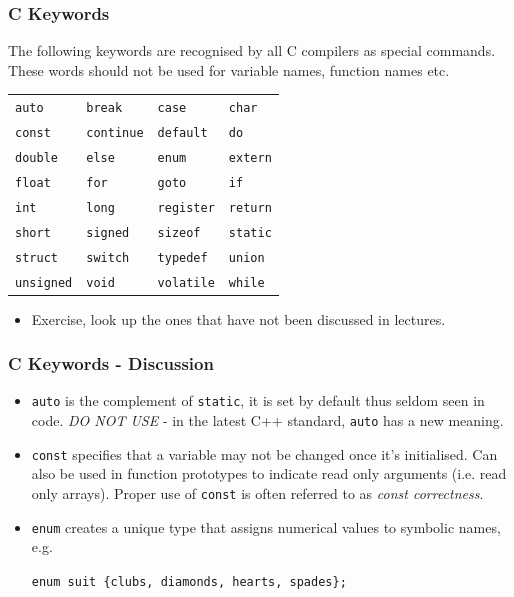 \documentclass[table]{beamer}
\newif\ifschigh\schighfalse
\newcommand{\kw}[1]{\ifschigh\textcolor{red}{#1}\else\textcolor{keyword}{#1}\fi}
\begin{document}
\begin{frame}
\frametitle{C Keywords}
The following keywords are recognised by all C compilers as special commands. These words should not be used for variable names, function names etc.
\begin{center}
\begin{tabular}{l l l l}
\tt\kw{auto}&\tt\kw{break}&\tt\kw{case}&\tt\kw{char}\\
\tt\kw{const}&\tt\kw{continue}&\tt\kw{default}&\tt\kw{do}\\
\tt\kw{double}&\tt\kw{else}&\tt\kw{enum}&\tt\kw{extern}\\
\tt\kw{float}&\tt\kw{for}&\tt\kw{goto}&\tt\kw{if}\\
\tt\kw{int}&\tt\kw{long}&\tt\kw{register}&\tt\kw{return}\\
\tt\kw{short}&\tt\kw{signed}&\tt\kw{sizeof}&\tt\kw{static}\\
\tt\kw{struct}&\tt\kw{switch}&\tt\kw{typedef}&\tt\kw{union}\\
\tt\kw{unsigned}&\tt\kw{void}&\tt\kw{volatile}&\tt\kw{while}
\end{tabular}
\end{center}
\begin{itemize}
\item Exercise, look up the ones that have not been discussed in lectures.
\end{itemize}
\end{frame}

\begin{frame}
\frametitle{C Keywords - Discussion}
\begin{itemize}
\item {\tt\kw{auto}} is the complement of {\tt\kw{static}}, it is set by default thus seldom seen in code. \emph{DO NOT USE} - in the latest C++ standard, {\tt\kw{auto}} has a new meaning.
\item {\tt\kw{const}} specifies that a variable may not be changed once it's initialised. Can also be used in function prototypes to indicate read only arguments (i.e. read only arrays). Proper use of {\tt\kw{const}} is often referred to as \emph{const correctness}.
\item {\tt\kw{enum}} creates a unique type that assigns numerical values to symbolic names, e.g.\\
\begin{center}
\tt \kw{enum} suit \{clubs, diamonds, hearts, spades\};
\end{center}
\end{itemize}
\end{frame}
\end{document}
